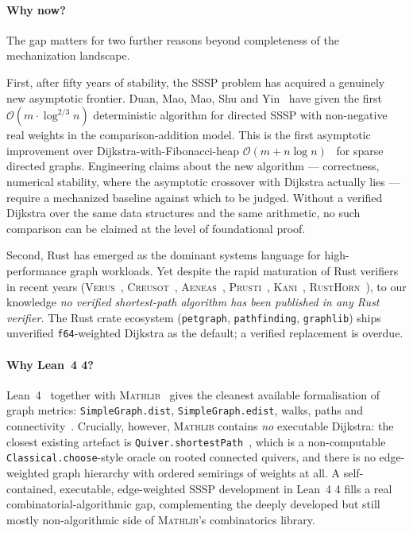 \documentclass[11pt,a4paper]{article}
\newcommand{\Lean}{Lean~4\xspace}
\newcommand{\Mathlib}{\textsc{Mathlib}\xspace}
\newcommand{\Dijkstra}{Dijkstra\xspace}
\newcommand{\Bigo}{\mathcal{O}}
\newcommand{\code}[1]{\texttt{#1}}
\theoremstyle{plain}
\theoremstyle{definition}
\begin{document}
\paragraph*{Why now?}
The gap matters for two further reasons beyond completeness of the
mechanization landscape.

First, after fifty years of stability, the SSSP problem has acquired a
genuinely new asymptotic frontier. Duan, Mao, Mao, Shu and
Yin~\cite{DuanMaoMaoShuYin2025} have given the first
$\Bigo(m \cdot \log^{2/3} n)$ deterministic algorithm for directed SSSP with
non-negative real weights in the comparison-addition model. This is the
first asymptotic improvement over \Dijkstra-with-Fibonacci-heap
$\Bigo(m + n \log n)$~\cite{FredmanTarjan1987} for sparse directed graphs.
Engineering claims about the new algorithm --- correctness, numerical
stability, where the asymptotic crossover with \Dijkstra{} actually lies ---
require a mechanized baseline against which to be judged. Without a verified
\Dijkstra{} over the same data structures and the same arithmetic, no such
comparison can be claimed at the level of foundational proof.

Second, Rust has emerged as the dominant systems language for
high-performance graph workloads. Yet despite the rapid maturation of Rust
verifiers in recent years (\textsc{Verus}~\cite{Lattuada2023Verus},
\textsc{Creusot}~\cite{DenisJourdanMarche2022Creusot},
\textsc{Aeneas}~\cite{HoProtzenko2022Aeneas},
\textsc{Prusti}~\cite{Astrauskas2019Prusti},
\textsc{Kani}~\cite{VanHattum2022Kani},
\textsc{RustHorn}~\cite{Matsushita2020RustHorn,Matsushita2022RustHornBelt}),
to our knowledge \emph{no verified shortest-path algorithm has been
published in any Rust verifier.} The Rust crate ecosystem (\code{petgraph},
\code{pathfinding}, \code{graphlib}) ships unverified \code{f64}-weighted
\Dijkstra{} as the default; a verified replacement is overdue.

\paragraph*{Why \Lean{} 4?}
\Lean{}~\cite{deMouraUllrich2021Lean4} together with \Mathlib~\cite{Mathlib2020}
gives the cleanest available formalisation of graph metrics:
\code{SimpleGraph.dist}, \code{SimpleGraph.edist}, walks, paths and
connectivity~\cite{MathlibSimpleGraph}. Crucially, however, \Mathlib{}
contains \emph{no} executable Dijkstra: the closest existing artefact is
\code{Quiver.shortestPath}~\cite{MathlibQuiver}, which is a non-computable
\code{Classical.choose}-style oracle on rooted connected quivers, and there
is no edge-weighted graph hierarchy with ordered semirings of weights at all.
A self-contained, executable, edge-weighted SSSP development in \Lean{} 4
fills a real combinatorial-algorithmic gap, complementing the deeply
developed but still mostly non-algorithmic side of \Mathlib's combinatorics
library.
\end{document}
